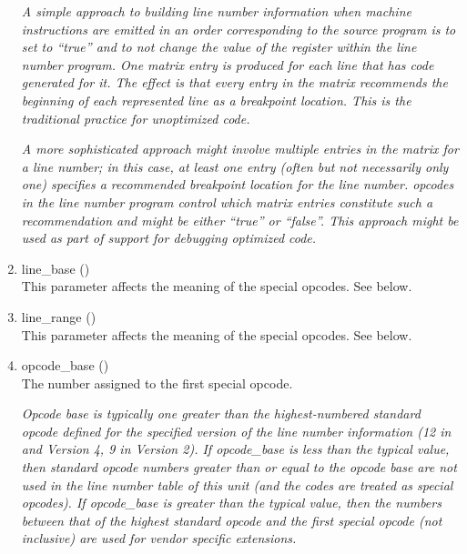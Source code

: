 \begin{enumerate}[1. ]
\textit{A simple approach
to building line number information when machine instructions
are emitted in an order corresponding to the source program
is to set  
to ``true'' and to not change the
value of the  register 
within the line number program.
One matrix entry is produced for each line that has code
generated for it. The effect is that every entry in the
matrix recommends the beginning of each represented line as
a breakpoint location. This is the traditional practice for
unoptimized code.}

\textit{A more sophisticated approach might involve multiple entries in
the matrix for a line number; in this case, at least one entry
(often but not necessarily only one) specifies a recommended
breakpoint location for the line number. 
opcodes in the line number program control which matrix entries
constitute such a recommendation and 
 might
be either ``true'' or ``false''. This approach might be
used as part of support for debugging optimized code.}

\item line\_base () \\
This parameter affects the meaning of the special opcodes. See below.

\item line\_range () \\
This parameter affects the meaning of the special opcodes. See below.

\item opcode\_base () \\
The 
number assigned to the first special opcode.

\textit{Opcode base is typically one greater than the highest-numbered
standard opcode defined for the specified version of the line
number information (12 in 
 and 
Version 4, 9 in
Version 2).  
If opcode\_base is less than the typical value,
then standard opcode numbers greater than or equal to the
opcode base are not used in the line number table of this unit
(and the codes are treated as special opcodes). If opcode\_base
is greater than the typical value, then the numbers between
that of the highest standard opcode and the first special
opcode (not inclusive) are used for vendor specific extensions.}


\end{enumerate}
